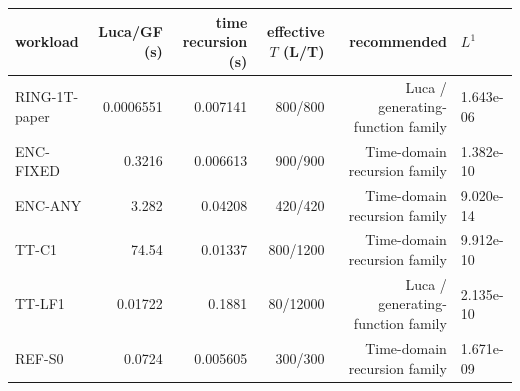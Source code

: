 \begin{tabular}{lrrrrl}
\toprule
 workload & Luca/GF (s) & time recursion (s) & effective $T$ (L/T) & recommended & $L^1$ \\
\midrule
RING-1T-paper & 0.0006551 & 0.007141 & 800/800 & Luca / generating-function family & 1.643e-06 \\
ENC-FIXED & 0.3216 & 0.006613 & 900/900 & Time-domain recursion family & 1.382e-10 \\
ENC-ANY & 3.282 & 0.04208 & 420/420 & Time-domain recursion family & 9.020e-14 \\
TT-C1 & 74.54 & 0.01337 & 800/1200 & Time-domain recursion family & 9.912e-10 \\
TT-LF1 & 0.01722 & 0.1881 & 80/12000 & Luca / generating-function family & 2.135e-10 \\
REF-S0 & 0.0724 & 0.005605 & 300/300 & Time-domain recursion family & 1.671e-09 \\
\bottomrule
\end{tabular}

